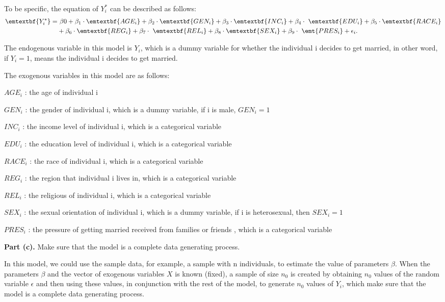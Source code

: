 \documentclass[letterpaper,12pt]{article}
\theoremstyle{definition}
\begin{document}
\noindent To be specific, the equation of $Y_{i}^*$ can be described as follows:
\begin{equation*}
\begin{split}
 \emtextbf{Y^*_{i}} = &~ \beta{0} + \beta_{1} \cdot \emtextbf{AGE_{i}} + \beta_{2} \cdot \emtextbf{GEN_{i}} + \beta_{3} \cdot \emtextbf{INC_{i}} + \beta_{4} \cdot\ \emtextbf{EDU_{i}} + \beta_{5} \cdot \emtextbf{RACE_{i}} \\ & + \beta_{6} \cdot \emtextbf{REG_{i}} + \beta_{7} \cdot\ \emtextbf{REL_{i}} + \beta_{8} \cdot \emtextbf{SEX_{i}} + \beta_{9} \cdot\ \emt{PRES_{i}} + \epsilon_{i}.
\end{split}
\end{equation*}

\noindent The endogenous variable in this model is $Y_{i}$, which is a dummy variable for whether the individual i decides to get married, in other word, if $Y_{i} = 1$, means the individual i decides to get married. 

\noindent The exogenous variables in this model are as follows:

\noindent $AGE_{i}$ : the age of individual i

\noindent $GEN_{i}$ : the gender of individual i, which is a dummy variable, if i is male, $GEN_{i} = 1$

\noindent $INC_{i}$ : the income level of individual i, which is a categorical variable

\noindent $EDU_{i}$ : the education level of individual i, which is a categorical variable

\noindent $RACE_{i}$ : the race of individual i, which is a categorical variable

\noindent $REG_{i}$ : the region that individual i lives in, which is a categorical variable

\noindent $REL_{i}$ : the religious of individual i, which is a categorical variable

\noindent $SEX_{i}$ : the sexual orientation of individual i, which is a dummy variable, if i is heterosexual, then $SEX_{i} = 1$

\noindent $PRES_{i}$ : the pressure of getting married received from families or friends , which is a categorical variable

\noindent\textbf{Part (c).} Make sure that the model is a complete data generating process.

\noindent In this model, we could use the sample data, for example, a sample with n individuals, to estimate the value of parameters $\beta$. When the parameters $ \beta $ and the vector of exogenous variables $ X $ is known (fixed), a sample of size $ n_{0}$ is created by obtaining $ n_{0}$ values of the random variable $ \epsilon$ and then using these values, in conjunction with the rest of the model, to generate $ n_{0}$ values of $ Y_{i}$, which make sure that the model is a complete data generating process.
\end{document}
